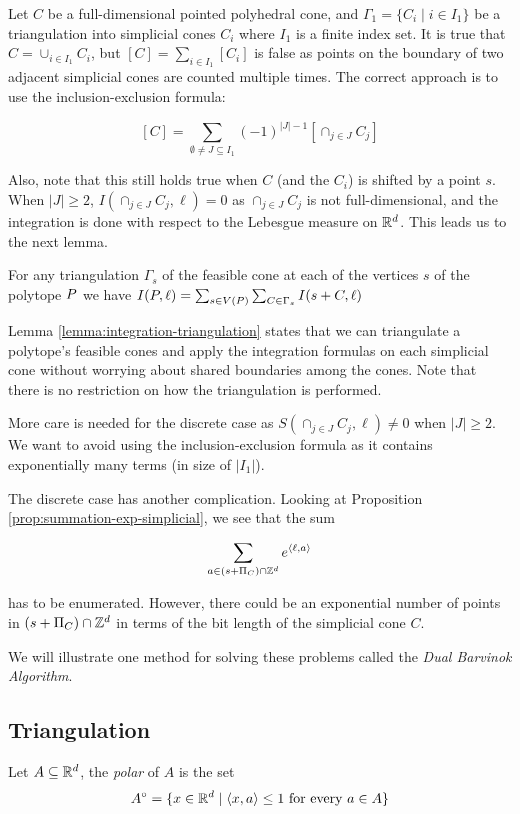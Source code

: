  Let $C$ be a full-dimensional pointed polyhedral cone, and $\Gamma_1 = \{ C_i \mid i \in I_1\}$ be a triangulation into simplicial cones $C_i$ where $I_1$ is a finite index set. It is true that $C = \cup_{i \in I_1} C_i$, but $[C] = \sum_{i \in I_1} [C_i]$ is false as points on the boundary of two adjacent simplicial cones are counted multiple times. The correct approach is to use the inclusion-exclusion formula:
 
 \[ [C] = \sum_{\emptyset \neq J \subseteq I_1} (-1)^{|J|-1} [\cap_{j \in J} C_j]\]

Also, note that this still holds true when $C$ (and the $C_i$) is shifted by a point $s$. When $|J| \geq 2$, $I(\cap_{j \in J} C_j, \ell) = 0$ as $\cap_{j \in J} C_j$ is not full-dimensional, and the integration is done with respect to the Lebesgue measure on ${\mathbb R}^d$. This leads us to the next lemma.

\begin{lemma}
\label{lemma:integration-triangulation}
For any triangulation $\Gamma_s$ of the feasible cone at each of the vertices $s$ of the polytope ${ P}$ we have $I({ P},\ell) = \sum_{s \in V({ P})} \sum_{C \in \Gamma_s} I(s+C,\ell)$
\end{lemma}

Lemma \ref{lemma:integration-triangulation} states that we can triangulate a polytope's feasible cones and apply the integration formulas on each simplicial cone without worrying about shared boundaries among the cones. Note that there is no restriction on how the triangulation is performed. 

More care is needed for the discrete case as $S(\cap_{j \in J} C_j, \ell) \neq 0$ when $|J| \geq 2$. We want to avoid using the inclusion-exclusion formula as it contains exponentially many terms (in size of $|I_1|$). 

The discrete case has another complication. Looking at Proposition \ref{prop:summation-exp-simplicial}, we see that the sum 

\[ \sum_{a \in (s+\Pi_C) \cap {\mathbb Z}^d} e^{{\langle} \ell, a {\rangle}}\]

has to be enumerated. However, there could be an exponential number of points in $(s+\Pi_C) \cap {\mathbb Z}^d$ in terms of the bit length of the simplicial cone $C$. 

We will illustrate one method for solving these problems called the \emph{Dual Barvinok Algorithm}.


\subsection{Triangulation}
\begin{definition}
Let $A \subseteq {\mathbb R}^d$, the \emph{polar} of $A$ is the set 
\[ A^\circ = \{ x \in {\mathbb R}^d \mid  {\langle} x, a {\rangle} \leq 1 \text{ for every } a \in A \}  \]
\end{definition}

